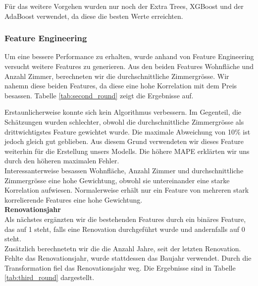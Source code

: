Für das weitere Vorgehen wurden nur noch der Extra Trees, XGBoost und der AdaBoost verwendet, da diese die besten Werte erreichten.
\subsubsection{Feature Engineering}
Um eine bessere Performance zu erhalten, wurde anhand von Feature Engineering versucht weitere Features zu generieren. Aus den beiden Features Wohnfläche und Anzahl Zimmer, berechneten wir die durchschnittliche Zimmergrösse. Wir nahemn diese beiden Features, da diese eine hohe Korrelation mit dem Preis besassen. Tabelle \ref{tab:second_round} zeigt die Ergebnisse auf.

\begin{table}[ht]
\centering
{}
\caption{Ergebnisse mit durchschnittlicher Zimmergrösse}
\label{tab:second_round}
\end{table}

Erstaunlicherweise konnte sich kein Algorithmus verbessern. Im Gegenteil, die Schätzungen wurden schlechter, obwohl die durchschnittliche Zimmergrösse als drittwichtigstes Feature gewichtet wurde. Die maximale Abweichung von 10\% ist jedoch gleich gut geblieben. Aus diesem Grund verwendeten wir dieses Feature weiterhin für die Erstellung unsers Modells. Die höhere MAPE erklärten wir uns durch den höheren maximalen Fehler.\\
Interessanterweise besassen Wohnfläche, Anzahl Zimmer und durchschnittliche Zimmergrösse eine hohe Gewichtung, obwohl sie untereinander eine starke Korrelation aufwiesen. Normalerweise erhält nur ein Feature von mehreren stark korrelierende Features eine hohe Gewichtung.\\[2ex]
%
\textbf{Renovationsjahr}\\
Als nächstes ergänzten wir die bestehenden Features durch ein binäres Feature, das auf 1 steht, falls eine Renovation durchgeführt wurde und andernfalls auf 0 steht.\\
Zusätzlich berechnetetn wir die die Anzahl Jahre, seit der letzten Renovation. Fehlte das Renovationsjahr, wurde stattdessen das Baujahr verwendet. Durch die Transformation fiel das Renovationsjahr weg. Die Ergebnisse sind in Tabelle \ref{tab:third_round} dargestellt.

